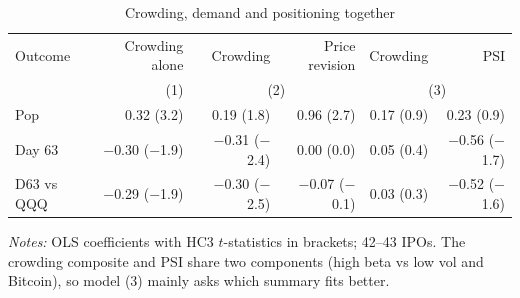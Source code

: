 \begin{table}[!htbp]\centering\footnotesize
\caption{Crowding, demand and positioning together}\label{tab:crowdrace}

\begin{threeparttable}
\begin{tabular}{lrrrrr}
\toprule
Outcome & Crowding alone & Crowding & Price revision & Crowding & PSI \\ & (1) & \multicolumn{2}{c}{(2)} & \multicolumn{2}{c}{(3)} \\
\midrule
Pop & 0.32 (3.2) & 0.19 (1.8) & 0.96 (2.7) & 0.17 (0.9) & 0.23 (0.9) \\
Day 63 & $-$0.30 ($-$1.9) & $-$0.31 ($-$2.4) & 0.00 (0.0) & 0.05 (0.4) & $-$0.56 ($-$1.7) \\
D63 vs QQQ & $-$0.29 ($-$1.9) & $-$0.30 ($-$2.5) & $-$0.07 ($-$0.1) & 0.03 (0.3) & $-$0.52 ($-$1.6) \\
\bottomrule
\end{tabular}
\begin{tablenotes}[flushleft]\footnotesize
\item \textit{Notes:} OLS coefficients with HC3 $t$-statistics in brackets; 42--43 IPOs. The crowding composite and PSI share two components (high beta vs low vol and Bitcoin), so model (3) mainly asks which summary fits better.
\end{tablenotes}
\end{threeparttable}

\end{table}
